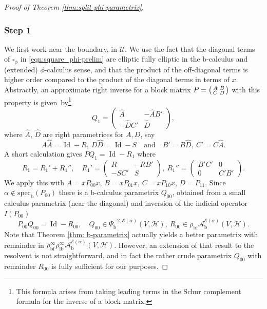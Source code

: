 \documentclass[JEP,XML,SOM,Unicode,NoFloatCountersInSection,published]{cedram}
\newenvironment{smallpmatrix}{\big(\begin{smallmatrix}}{\end{smallmatrix}\big)}
\theoremstyle{plain}
\theoremstyle{definition}
\newcommand{\Umath}{{\mathscr{U}}}
\newcommand{\Hmath}{{\mathscr{H}}}
\newcommand\calA{{\mathcal A}}
\newcommand\calE{{\mathcal E}}
\newcommand{\lf}{{\mathrm{lb}}}
\newcommand{\bb}{{\mathrm{b}}}
\newcommand{\bbf}{{\mathrm{bf}}}
\newcommand{\specb}{\mathrm{spec}_\bb}
\DeclareMathOperator{\Id}{Id}
\begin{document}
\begin{proof}[Proof of Theorem \ref{thm:split phi-parametrix}]
\subsubsection*{Step 1}
We first work near the boundary, \ie in $\Umath$.
We use the fact that the diagonal terms of $\square_\phi$ in \eqref{eqn:square_phi-prelim} are elliptic \resp fully elliptic in the
b-calculus and (extended) $\phi$-calculus sense, and that the product of the off-diagonal terms is higher order compared to the product of the diagonal terms in terms of $x$.
Abstractly, an approximate right inverse for a block matrix $P=
\begin{smallpmatrix}
A & B\\ C & D
\end{smallpmatrix}
$ with this property is given~by\footnote{This formula arises from taking leading terms
in the Schur complement formula for the inverse of a block matrix.}
\begin{equation}\label{Q1}
Q_1= \begin{pmatrix}
\widehat{A} & - \widehat{A} B' \\ -\widehat{D} C' & \widehat{D}
\end{pmatrix},
\end{equation}
where $\widehat{A}$, $\widehat{D}$ are right parametrices for $A,D$, say
\[
A\widehat{A}=\Id - R,\ D\widehat{D}=\Id-S\quad\text{and}\quad B' = B\widehat{D},\ C'=C\widehat{A}.
\]
A short calculation gives $PQ_1=\Id - R_1 $ where
\[
R_1=R_1'+R_1'', \quad R_1' =
\begin{pmatrix}
R & -RB' \\
-SC' & S
\end{pmatrix}
,\ R_1'' =
\begin{pmatrix}
B'C' & 0\\
0 & C'B'
\end{pmatrix}.
\]
We apply this with $A=xP_{00}x$, $B=xP_{01}x$, $C=xP_{10}x$, $D=P_{11}$.
Since $\alpha\not\in \specb(P_{00})$ there is a b-calculus parametrix $Q_{00}$,
obtained from a small calculus parametrix (near the diagonal) and inversion of the
indicial operator $I(P_{00})$
\begin{equation}
\label{eqn:Q00 R00}
P_{00}Q_{00} = \Id - R_{00},\quad Q_{00}\in\Psi_\bb^{-2,\calE(\alpha)}(V,\Hmath),\
R_{00}\in \rho_\bbf \calA_\bb^{\calE(\alpha)}(V,\Hmath).
\end{equation}
Note that Theorem \ref{thm: b-parametrix} actually yields a better parametrix
with remainder in $\rho^\infty_\bbf\rho^\infty_\lf \calA_\bb^{\calE(\alpha)}(V,\Hmath)$.
However, an extension of that result to the resolvent is not straightforward,
and in fact the rather crude parametrix $Q_{00}$ with remainder $R_{00}$
is fully sufficient for our purposes.


\end{proof}
\end{document}
